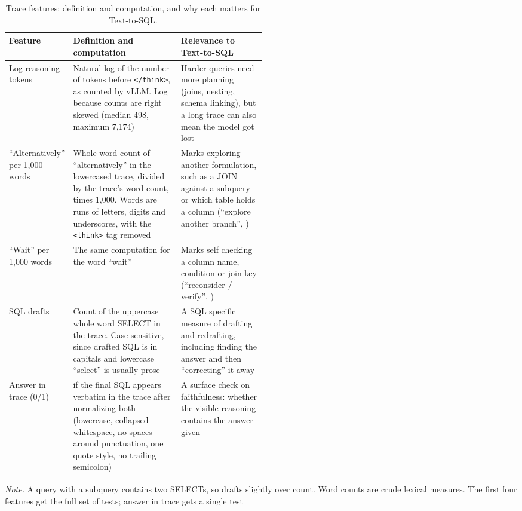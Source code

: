 \begin{table}[htbp]
\centering
\caption{Trace features: definition and computation, and why each matters for Text-to-SQL.}
\label{tab:features}
\scriptsize
\begin{tabularx}{\linewidth}{@{}>{\raggedright\arraybackslash}p{0.17\linewidth}>{\raggedright\arraybackslash}X>{\raggedright\arraybackslash}p{0.33\linewidth}@{}}
\toprule
Feature & Definition and computation & Relevance to Text-to-SQL \\
\midrule
Log reasoning tokens & Natural log of the number of tokens before \texttt{</think>}, as counted by vLLM. Log because counts are right skewed (median 498, maximum 7,174) & Harder queries need more planning (joins, nesting, schema linking), but a long trace can also mean the model got lost \citep{tian2026week3} \\
``Alternatively'' per 1,000 words & Whole-word count of ``alternatively'' in the lowercased trace, divided by the trace's word count, times 1,000. Words are runs of letters, digits and underscores, with the \texttt{<think>} tag removed & Marks exploring another formulation, such as a JOIN against a subquery or which table holds a column (``explore another branch'', \citealp{tian2026week3}) \\
``Wait'' per 1,000 words & The same computation for the word ``wait'' & Marks self checking a column name, condition or join key (``reconsider / verify'', \citealp{tian2026week3}) \\
SQL drafts & Count of the uppercase whole word SELECT in the trace. Case sensitive, since drafted SQL is in capitals and lowercase ``select'' is usually prose & A SQL specific measure of drafting and redrafting, including finding the answer and then ``correcting'' it away \citep{tian2026week3} \\
Answer in trace (0/1) & 1 if the final SQL appears verbatim in the trace after normalizing both (lowercase, collapsed whitespace, no spaces around punctuation, one quote style, no trailing semicolon) & A surface check on faithfulness: whether the visible reasoning contains the answer given \citep{chen2025reasoning} \\
\bottomrule
\end{tabularx}

\vspace{2pt}
\begin{minipage}{\linewidth}\scriptsize
\textit{Note.} A query with a subquery contains two SELECTs, so drafts slightly over count. Word counts are crude lexical measures. The first four features get the full set of tests; answer in trace gets a single test
\end{minipage}
\end{table}

